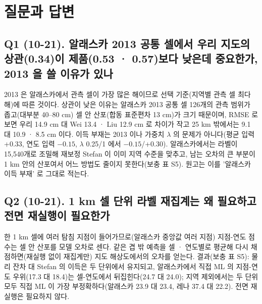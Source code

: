 \documentclass[10pt,a4paper]{article}
\begin{document}
\section{질문과 답변}

\subsection*{Q1 (10-21). 알래스카 2013 공통 셀에서 우리 지도의 상관(0.34)이 제품(0.53 · 0.57)보다 낮은데 중요한가, 2013 을 쓸 이유가 있나}
2013 은 알래스카에서 관측 셀이 가장 많은 해이므로 선택 기준(지역별 관측 셀 최다 해)에 따른 것이다. 상관이 낮은 이유는 알래스카 2013 공통 셀 126개의 관측 범위가 좁고(대부분 40--80 cm) 셀 안 산포(합동 표준편차 13 cm)가 크기 때문이며, RMSE 로 보면 우리 14.9 cm 대 Wei 13.4 · Liu 12.9 cm 로 차이가 작고 25 km 밖에서는 9.1 대 10.9 · 8.5 cm 이다. 이득 부재는 2013 이나 가중치 $\lambda$ 의 문제가 아니다(평균 입력 +0.33, 연도 입력 $-0.15$, $\lambda$ 0.25/1 에서 $-0.15$/+0.30). 알래스카에서는 라벨이 15,540개로 조밀해 재보정 Stefan 이 이미 지역 수준을 맞추고, 남는 오차의 큰 부분이 1 km 안의 산포여서 어느 방법도 줄이지 못한다(보충 표 S5). 원고는 이를 '알래스카 이득 부재' 로 그대로 적는다.

\subsection*{Q2 (10-21). 1 km 셀 단위 라벨 재집계는 왜 필요하고 전면 재실행이 필요한가}
한 1 km 셀에 여러 탐침 지점이 들어가므로(알래스카 중앙값 여러 지점) 지점-연도 점수는 셀 안 산포를 모델 오차로 센다. 같은 겹 밖 예측을 셀 · 연도별로 평균해 다시 채점하면(재실행 없이 재집계만) 지도 해상도에서의 오차를 얻는다. 결과(보충 표 S5): 물리 잔차 대 Stefan 의 이득은 두 단위에서 유지되고, 알래스카에서 직접 ML 의 지점-연도 우위(17.3 대 18.4)는 셀-연도에서 뒤집힌다(24.7 대 24.0); 지역 제외에서는 두 단위 모두 직접 ML 이 가장 부정확하다(알래스카 23.9 대 23.4, 레나 37.4 대 22.2). 전면 재실행은 필요하지 않다.
\end{document}
